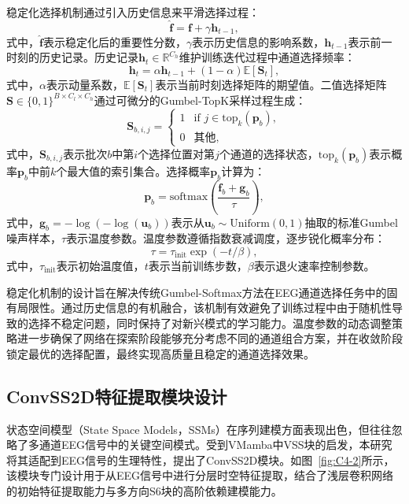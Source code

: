 稳定化选择机制通过引入历史信息来平滑选择过程：
\begin{equation}
\hat{\mathbf{f}} = \mathbf{f} + \gamma\mathbf{h}_{t-1},
\end{equation}
式中，$\hat{\mathbf{f}}$表示稳定化后的重要性分数，$\gamma$表示历史信息的影响系数，$\mathbf{h}_{t-1}$表示前一时刻的历史记录。历史记录$\mathbf{h}_t \in \mathbb{R}^{C_h}$维护训练迭代过程中通道选择频率：
\begin{equation}
\mathbf{h}_t = \alpha\mathbf{h}_{t-1} + (1-\alpha)\mathbb{E}[\mathbf{S}_t],
\end{equation}
式中，$\alpha$表示动量系数，$\mathbb{E}[\mathbf{S}_t]$表示当前时刻选择矩阵的期望值。二值选择矩阵$\mathbf{S} \in \{0,1\}^{B \times C_l \times C_h}$通过可微分的Gumbel-TopK采样过程生成：
\begin{equation}
\mathbf{S}_{b,i,j} = \begin{cases}
1 & \text{if } j \in \text{top}_k(\mathbf{p}_b), \\
0 & \text{其他},
\end{cases}
\end{equation}
式中，$\mathbf{S}_{b,i,j}$表示批次$b$中第$i$个选择位置对第$j$个通道的选择状态，$\text{top}_k(\mathbf{p}_b)$表示概率$\mathbf{p}_b$中前$k$个最大值的索引集合。选择概率$\mathbf{p}_b$计算为：
\begin{equation}
\mathbf{p}_b = \text{softmax}\left(\frac{\hat{\mathbf{f}}_b + \mathbf{g}_b}{\tau}\right),
\end{equation}
式中，$\mathbf{g}_b = -\log(-\log(\mathbf{u}_b))$表示从$\mathbf{u}_b \sim \text{Uniform}(0,1)$抽取的标准Gumbel噪声样本，$\tau$表示温度参数。温度参数遵循指数衰减调度，逐步锐化概率分布：
\begin{equation}
\tau = \tau_{\text{init}}\exp(-t/\beta),
\end{equation}
式中，$\tau_{\text{init}}$表示初始温度值，$t$表示当前训练步数，$\beta$表示退火速率控制参数。

稳定化机制的设计旨在解决传统Gumbel-Softmax方法在EEG通道选择任务中的固有局限性。通过历史信息的有机融合，该机制有效避免了训练过程中由于随机性导致的选择不稳定问题，同时保持了对新兴模式的学习能力。温度参数的动态调整策略进一步确保了网络在探索阶段能够充分考虑不同的通道组合方案，并在收敛阶段锁定最优的选择配置，最终实现高质量且稳定的通道选择效果。

\subsection{ConvSS2D特征提取模块设计}
状态空间模型（State Space Models，SSMs）在序列建模方面表现出色，但往往忽略了多通道EEG信号中的关键空间模式。受到VMamba中VSS块的启发\cite{liu2024vmamba}，本研究将其适配到EEG信号的生理特性，提出了ConvSS2D模块。如图~\ref{fig:C4-2}所示，该模块专门设计用于从EEG信号中进行分层时空特征提取，结合了浅层卷积网络\cite{borra2020interpretable}的初始特征提取能力与多方向S6块\cite{gu2023mamba}的高阶依赖建模能力。

